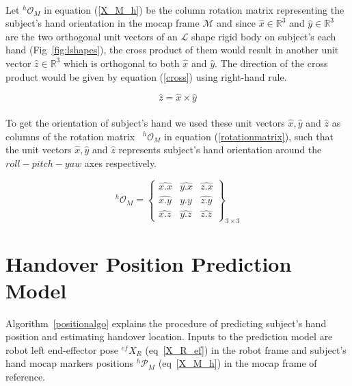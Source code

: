 \paragraph*{}
Let ${}^{h}\mathcal{O}_{M}$ in equation (\ref{X_M_h}) be the column rotation matrix representing the subject's hand orientation in the mocap frame $\mathcal{M}$ and since $\hat{x} \in \mathbb{R}^{3}$ and $\hat{y} \in \mathbb{R}^{3}$ are the two orthogonal unit vectors of an $\mathcal{L}$ shape rigid body on subject's each hand (Fig~\ref{fig:lshapes}), the cross product of them would result in another unit vector $\hat{z} \in \mathbb{R}^{3}$ which is orthogonal to both $\hat{x}$ and $\hat{y}$. The direction of the cross product would be given by equation (\ref{cross}) using right-hand rule.


\begin{equation}\label{cross}
\hat{z} = \hat{x} \times \hat{y}
\end{equation}


\paragraph*{}
To get the orientation of subject's hand we used these unit vectors $\hat{x}, \hat{y}$ and $\hat{z}$ as columns of the rotation matrix~\cite{evans2001rotations, altmann2005rotations, jia2017rotation} ${}^{h}\mathcal{O}_{M}$ in equation (\ref{rotationmatrix}), such that the unit vectors $\hat{x}, \hat{y}$ and $\hat{z}$ represents subject's hand orientation around the $roll-pitch-yaw$ axes respectively.

\begin{equation}\label{rotationmatrix}
{}^{h}\mathcal{O}_{M} = 
\left\{\begin{array}{cccc}
\hat{x.x} & \hat{y.x} & \hat{z.x} \\
\hat{x.y} & \hat{y.y} & \hat{z.y} \\
\hat{x.z} & \hat{y.z} & \hat{z.z}
\end{array}\right\}_{3\times 3}
\end{equation}



\newpage
\section{Handover Position Prediction Model}

Algorithm~\ref{positionalgo} explains the procedure of predicting subject's hand position and estimating handover location. Inputs to the prediction model are robot left end-effector pose $\mathcal{}^{ef}{X}_R$ (eq~\ref{X_R_ef}) in the robot frame and subject's hand mocap markers positions ${}^{h}\mathcal{P}_M$ (eq~\ref{X_M_h}) in the mocap frame of reference.

